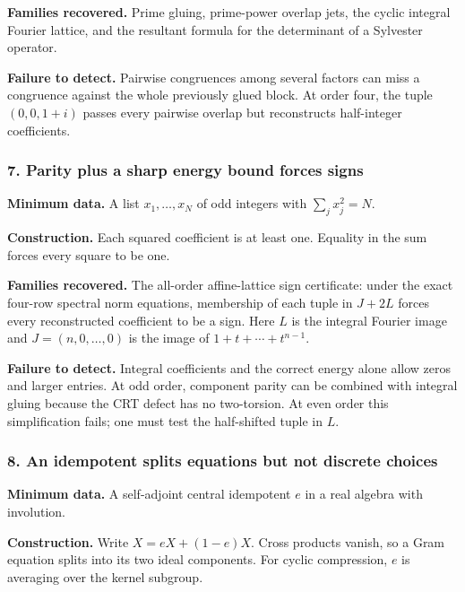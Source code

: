 \documentclass[
  11pt,
]{article}
\begin{document}
\textbf{Families recovered.} Prime gluing, prime-power overlap jets, the
cyclic integral Fourier lattice, and the resultant formula for the
determinant of a Sylvester operator.

\textbf{Failure to detect.} Pairwise congruences among several factors
can miss a congruence against the whole previously glued block. At order
four, the tuple \((0,0,1+i)\) passes every pairwise overlap but
reconstructs half-integer coefficients.

\subsubsection*{7. Parity plus a sharp energy bound forces
signs}\label{parity-plus-a-sharp-energy-bound-forces-signs}

\textbf{Minimum data.} A list \(x_1,\ldots,x_N\) of odd integers with
\(\sum_jx_j^2=N\).

\textbf{Construction.} Each squared coefficient is at least one.
Equality in the sum forces every square to be one.

\textbf{Families recovered.} The all-order affine-lattice sign
certificate: under the exact four-row spectral norm equations,
membership of each tuple in \(J+2L\) forces every reconstructed
coefficient to be a sign. Here \(L\) is the integral Fourier image and
\(J=(n,0,\ldots,0)\) is the image of \(1+t+\cdots+t^{n-1}\).

\textbf{Failure to detect.} Integral coefficients and the correct energy
alone allow zeros and larger entries. At odd order, component parity can
be combined with integral gluing because the CRT defect has no
two-torsion. At even order this simplification fails; one must test the
half-shifted tuple in \(L\).

\subsubsection*{8. An idempotent splits equations but not discrete
choices}\label{an-idempotent-splits-equations-but-not-discrete-choices}

\textbf{Minimum data.} A self-adjoint central idempotent \(e\) in a real
algebra with involution.

\textbf{Construction.} Write \(X=eX+(1-e)X\). Cross products vanish, so
a Gram equation splits into its two ideal components. For cyclic
compression, \(e\) is averaging over the kernel subgroup.
\end{document}
